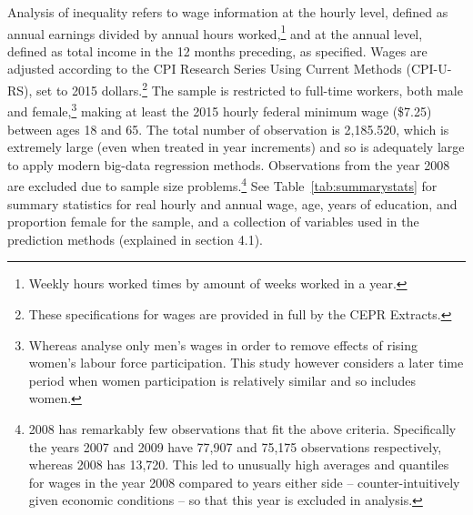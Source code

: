 \documentclass[notitlepage,12pt]{article}
\newcommand{\1}[1]{\ensuremath{\mathbb{1}\left( #1 \right)}}               %
\begin{document}
Analysis of inequality refers to wage information at the hourly level, defined as annual earnings divided by annual hours worked,\footnote{Weekly hours worked times by amount of weeks worked in a year.} and at the annual level, defined as total income in the 12 months preceding, as specified.  Wages are adjusted according to the CPI Research Series Using Current Methods (CPI-U-RS), set to 2015 dollars.\footnote{These specifications for wages are provided in full by the CEPR Extracts.}  The sample is restricted to full-time workers, both male and female,\footnote{Whereas \cite{juhn1993wage} analyse only men's wages in order to remove effects of rising women's labour force participation.  This study however considers a later time period when women participation is relatively similar and so includes women.} making at least the 2015 hourly federal minimum wage (\$7.25) between ages 18 and 65.  The total number of observation is 2,185.520, which is extremely large (even when treated in year increments) and so is adequately large to apply modern big-data regression methods.\nocite{varian2014big}  Observations from the year 2008 are excluded due to sample size problems.\footnote{2008 has remarkably few observations that fit the above criteria.  Specifically the years 2007 and 2009 have 77,907 and 75,175 observations respectively, whereas 2008 has 13,720.  This led to unusually high averages and quantiles for wages in the year 2008 compared to years either side -- counter-intuitively given economic conditions -- so that this year is excluded in analysis.}  See Table~\ref{tab:summarystats} for summary statistics for real hourly and annual wage, age, years of education, and proportion female for the sample, and a collection of variables used in the prediction methods (explained in section 4.1).
\end{document}
